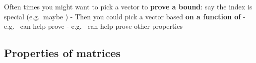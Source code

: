 Often times you might want to pick a vector to \textbf{prove a bound}:
say the index  is special (e.g.~maybe
)
- Then you could pick a vector  based \textbf{on a
function of } -
e.g.~ can
help prove
-
e.g.~
can help prove other properties

\subsection*{Properties of matrices}

